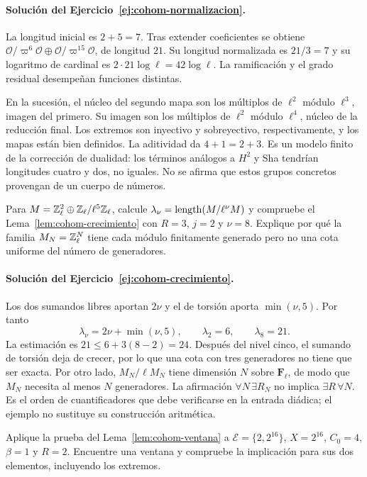 \paragraph{Solución del Ejercicio~\ref{ej:cohom-normalizacion}.}
La longitud inicial es $2+5=7$.
Tras extender coeficientes se obtiene
$\mathcal O/\varpi^6\mathcal O\oplus
\mathcal O/\varpi^{15}\mathcal O$,
de longitud $21$.
Su longitud normalizada es $21/3=7$ y su logaritmo
de cardinal es $2\cdot21\log\ell=42\log\ell$.
La ramificación y el grado residual desempeñan
funciones distintas.

En la sucesión, el núcleo del segundo mapa son los
múltiplos de $\ell^2$ módulo $\ell^3$, imagen del
primero. Su imagen son los múltiplos de $\ell^2$
módulo $\ell^4$, núcleo de la reducción final.
Los extremos son inyectivo y sobreyectivo,
respectivamente, y los mapas están bien definidos.
La aditividad da $4+1=2+3$.
Es un modelo finito de la corrección de dualidad:
los términos análogos a $H^2$ y Sha tendrían longitudes
cuatro y dos, no iguales.
No se afirma que estos grupos concretos provengan
de un cuerpo de números.

\begin{ejercicio}\label{ej:cohom-crecimiento}
Para $M=\mathbb{Z}_\ell^2\oplus\mathbb{Z}_\ell/\ell^5\mathbb{Z}_\ell$,
calcule $\lambda_\nu=\operatorname{length}(M/\ell^\nu M)$ y
compruebe el Lema~\ref{lem:cohom-crecimiento} con
$R=3$, $j=2$ y $\nu=8$.
Explique por qué la familia $M_N=\mathbb{Z}_\ell^N$ tiene
cada módulo finitamente generado pero no una cota
uniforme del número de generadores.
\end{ejercicio}

\paragraph{Solución del Ejercicio~\ref{ej:cohom-crecimiento}.}
Los dos sumandos libres aportan $2\nu$ y el de torsión
aporta $\min(\nu,5)$. Por tanto
\[
 \lambda_\nu=2\nu+\min(\nu,5),\qquad
 \lambda_2=6,\qquad\lambda_8=21.
\]
La estimación es $21\le6+3(8-2)=24$.
Después del nivel cinco, el sumando de torsión deja
de crecer, por lo que una cota con tres generadores
no tiene que ser exacta.
Por otro lado, $M_N/\ell M_N$ tiene dimensión $N$
sobre $\mathbf F_\ell$, de modo que $M_N$ necesita
al menos $N$ generadores.
La afirmación $\forall N\,\exists R_N$ no implica
$\exists R\,\forall N$.
Es el orden de cuantificadores que debe verificarse
en la entrada diádica; el ejemplo no sustituye su
construcción aritmética.

\begin{ejercicio}\label{ej:cohom-ventana}
Aplique la prueba del Lema~\ref{lem:cohom-ventana}
a $\mathcal E=\{2,2^{16}\}$, $X=2^{16}$,
$C_0=4$, $\beta=1$ y $R=2$.
Encuentre una ventana y compruebe la implicación
para sus dos elementos, incluyendo los extremos.
\end{ejercicio}

